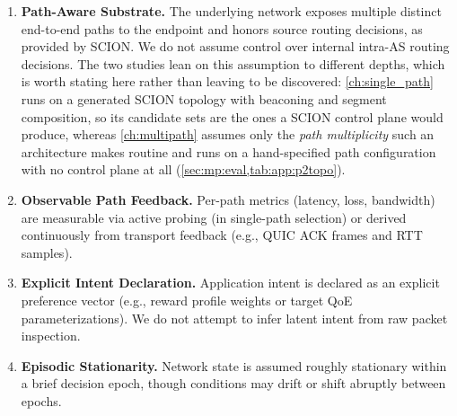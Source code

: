 \begin{enumerate}
  \item \textbf{Path-Aware Substrate.} The underlying network exposes multiple distinct end-to-end paths to the endpoint and honors source routing decisions, as provided by SCION. We do not assume control over internal intra-AS routing decisions. The two studies lean on this assumption to different depths, which is worth stating here rather than leaving to be discovered: \cref{ch:single_path} runs on a generated SCION topology with beaconing and segment composition, so its candidate sets are the ones a SCION control plane would produce, whereas \cref{ch:multipath} assumes only the \emph{path multiplicity} such an architecture makes routine and runs on a hand-specified path configuration with no control plane at all (\cref{sec:mp:eval,tab:app:p2topo}).
  
  \item \textbf{Observable Path Feedback.} Per-path metrics (latency, loss, bandwidth) are measurable via active probing (in single-path selection) or derived continuously from transport feedback (e.g., QUIC ACK frames and RTT samples).
  
  \item \textbf{Explicit Intent Declaration.} Application intent is declared as an explicit preference vector (e.g., reward profile weights or target QoE parameterizations). We do not attempt to infer latent intent from raw packet inspection.
  
  \item \textbf{Episodic Stationarity.} Network state is assumed roughly stationary within a brief decision epoch, though conditions may drift or shift abruptly between epochs.
\end{enumerate}